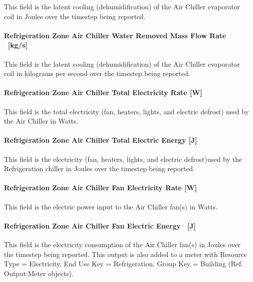 This field is the latent cooling (dehumidification) of the Air Chiller evaporator coil in Joules over the timestep being reported.

\paragraph{Refrigeration Zone Air Chiller Water Removed Mass Flow Rate ~{[}kg/s{]}}\label{refrigeration-zone-air-chiller-water-removed-mass-flow-rate-kgs-1}

This field is the latent cooling (dehumidification) of the Air Chiller evaporator coil in kilograms per second over the timestep being reported.

\paragraph{Refrigeration Zone Air Chiller Total Electricity Rate {[}W{]}}\label{refrigeration-zone-air-chiller-total-electric-power-w}

This field is the total electricity (fan, heaters, lights, and electric defrost) used by the Air Chiller in Watts.

\paragraph{Refrigeration Zone Air Chiller Total Electric Energy {[}J{]}}\label{refrigeration-zone-air-chiller-total-electric-energy-j}

This field is the electricity (fan, heaters, lights, and electric defrost)used by the Refrigeration chiller in Joules over the timestep being reported.

\paragraph{Refrigeration Zone Air Chiller Fan Electricity Rate {[}W{]}}\label{refrigeration-zone-air-chiller-fan-electric-power-w}

This field is the electric power input to the Air Chiller fan(s) in Watts.

\paragraph{Refrigeration Zone Air Chiller Fan Electric Energy ~{[}J{]}}\label{refrigeration-zone-air-chiller-fan-electric-energy-j}

This field is the electricity consumption of the Air Chiller fan(s) in Joules over the timestep being reported. This output is also added to a meter with Resource Type = Electricity, End Use Key = Refrigeration, Group Key = Building (Ref. Output:Meter objects).

